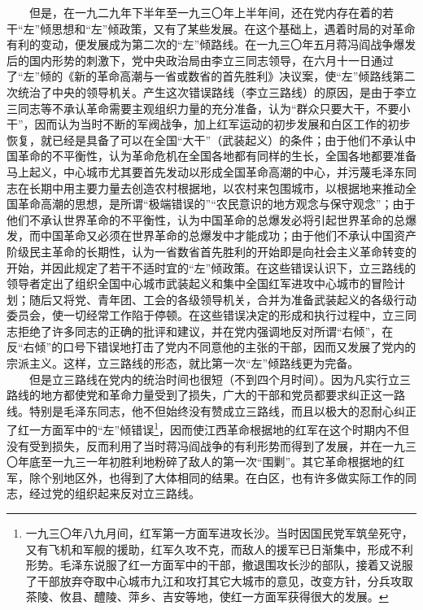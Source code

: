 \documentclass[cn,11pt,chinese]{elegantbook}
\begin{document}
　　但是，在一九二九年下半年至一九三〇年上半年间，还在党内存在着的若干“左”倾思想和“左”倾政策，又有了某些发展。在这个基础上，遇着时局的对革命有利的变动，便发展成为第二次的“左”倾路线。在一九三〇年五月蒋冯阎战争爆发后的国内形势的刺激下，党中央政治局由李立三同志领导，在六月十一日通过了“左”倾的《新的革命高潮与一省或数省的首先胜利》决议案，使“左”倾路线第二次统治了中央的领导机关。产生这次错误路线（李立三路线）的原因，是由于李立三同志等不承认革命需要主观组织力量的充分准备，认为“群众只要大干，不要小干”，因而认为当时不断的军阀战争，加上红军运动的初步发展和白区工作的初步恢复，就已经是具备了可以在全国“大干”（武装起义）的条件；由于他们不承认中国革命的不平衡性，认为革命危机在全国各地都有同样的生长，全国各地都要准备马上起义，中心城市尤其要首先发动以形成全国革命高潮的中心，并污蔑毛泽东同志在长期中用主要力量去创造农村根据地，以农村来包围城市，以根据地来推动全国革命高潮的思想，是所谓“极端错误的”“农民意识的地方观念与保守观念”；由于他们不承认世界革命的不平衡性，认为中国革命的总爆发必将引起世界革命的总爆发，而中国革命又必须在世界革命的总爆发中才能成功；由于他们不承认中国资产阶级民主革命的长期性，认为一省数省首先胜利的开始即是向社会主义革命转变的开始，并因此规定了若干不适时宜的“左”倾政策。在这些错误认识下，立三路线的领导者定出了组织全国中心城市武装起义和集中全国红军进攻中心城市的冒险计划；随后又将党、青年团、工会的各级领导机关，合并为准备武装起义的各级行动委员会，使一切经常工作陷于停顿。在这些错误决定的形成和执行过程中，立三同志拒绝了许多同志的正确的批评和建议，并在党内强调地反对所谓“右倾”，在反“右倾”的口号下错误地打击了党内不同意他的主张的干部，因而又发展了党内的宗派主义。这样，立三路线的形态，就比第一次“左”倾路线更为完备。\\
　　但是立三路线在党内的统治时间也很短（不到四个月时间）。因为凡实行立三路线的地方都使党和革命力量受到了损失，广大的干部和党员都要求纠正这一路线。特别是毛泽东同志，他不但始终没有赞成立三路线，而且以极大的忍耐心纠正了红一方面军中的“左”倾错误\footnote[5]{ 一九三〇年八九月间，红军第一方面军进攻长沙。当时因国民党军筑垒死守，又有飞机和军舰的援助，红军久攻不克，而敌人的援军已日渐集中，形成不利形势。毛泽东说服了红一方面军中的干部，撤退围攻长沙的部队，接着又说服了干部放弃夺取中心城市九江和攻打其它大城市的意见，改变方针，分兵攻取茶陵、攸县、醴陵、萍乡、吉安等地，使红一方面军获得很大的发展。}，因而使江西革命根据地的红军在这个时期内不但没有受到损失，反而利用了当时蒋冯阎战争的有利形势而得到了发展，并在一九三〇年底至一九三一年初胜利地粉碎了敌人的第一次“围剿”。其它革命根据地的红军，除个别地区外，也得到了大体相同的结果。在白区，也有许多做实际工作的同志，经过党的组织起来反对立三路线。\\
\end{document}
